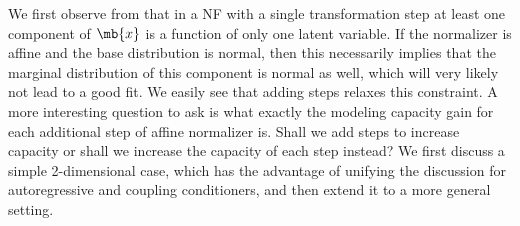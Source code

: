 We first observe from  that in a NF with a single transformation step at least one component of $\mb{x}$ is a function of only one latent variable.
If the normalizer is affine and the base distribution is normal, then this necessarily implies that the marginal distribution of this component is normal as well, which will very likely not lead to a good fit.
We easily see that adding steps relaxes this constraint.
A more interesting question to ask is what exactly the modeling capacity gain for each additional step of affine normalizer is. Shall we add steps to increase capacity or shall we increase the capacity of each step instead?
We first discuss a simple 2-dimensional case, which has the advantage of unifying the discussion for autoregressive and coupling conditioners, and then extend it to a more general setting.


